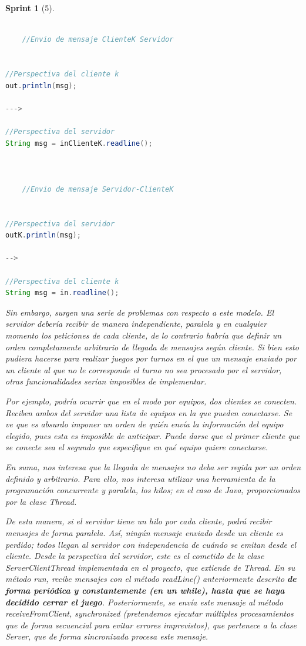 \documentclass[12pt,a4paper,openright]{book}
\theoremstyle{break}
\newtheorem*{sprint}{Sprint}
\begin{document}
\begin{sprint}[5]
\begin{lstlisting}[frame=single, language=Java]

	//Envio de mensaje ClienteK Servidor


//Perspectiva del cliente k
out.println(msg);

--->

//Perspectiva del servidor
String msg = inClienteK.readline();



	//Envio de mensaje Servidor-ClienteK


//Perspectiva del servidor
outK.println(msg);

-->

//Perspectiva del cliente k
String msg = in.readline();
\end{lstlisting}

Sin embargo, surgen una serie de problemas con respecto a este modelo. El servidor debería recibir de manera independiente, paralela y en cualquier momento los peticiones de cada cliente, de lo contrario habría que definir un orden completamente arbitrario de llegada de mensajes según cliente. Si bien esto pudiera hacerse para realizar juegos por turnos en el que un mensaje enviado por un cliente al que no le corresponde el turno no sea procesado por el servidor, otras funcionalidades serían imposibles de implementar.

Por ejemplo, podría ocurrir que en el modo por equipos, dos clientes se conecten. Reciben ambos del servidor una lista de equipos en la que pueden conectarse. Se ve que es absurdo imponer un orden de quién envía la información del equipo elegido, pues esta es imposible de anticipar. Puede darse que el primer cliente que se conecte sea el segundo que especifique en qué equipo quiere conectarse.

En suma, nos interesa que la llegada de mensajes no deba ser regida por un orden definido y arbitrario. Para ello, nos interesa utilizar una herramienta de la programación concurrente y paralela, los hilos; en el caso de Java, proporcionados por la clase Thread.

De esta manera, si el servidor tiene un hilo por cada cliente, podrá recibir mensajes de forma paralela. Así, ningún mensaje enviado desde un cliente es perdido; todos llegan al servidor con independencia de cuándo se emitan desde el cliente. Desde la perspectiva del servidor, este es el cometido de la clase ServerClientThread implementada en el proyecto, que extiende de Thread. En su método run, recibe mensajes con el método readLine() anteriormente descrito \textbf{de forma periódica y constantemente (en un while), hasta que se haya decidido cerrar el juego}. Posteriormente, se envía este mensaje al método receiveFromClient, synchronized (pretendemos ejecutar múltiples procesamientos que de forma secuencial para evitar errores imprevistos), que pertenece a la clase Server, que de forma sincronizada procesa este mensaje.


\end{sprint}
\end{document}
